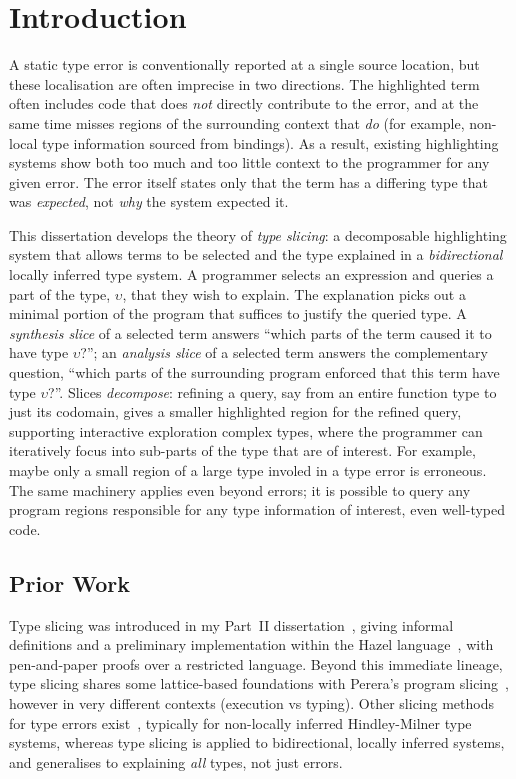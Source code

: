 \section{Introduction}
\label{sec:intro}

A static type error is conventionally reported at a single source location, but these localisation are often imprecise in two directions. The highlighted term often includes code that does \textit{not} directly contribute to the error, and at the same time misses regions of the surrounding context that \textit{do} (for example, non-local type information sourced from bindings). As a result, existing highlighting systems show both too much and too little context to the programmer for any given error. The error itself states only that the term has a differing type that was \textit{expected}, not \textit{why} the system expected it.

This dissertation develops the theory of \textit{type slicing}: a decomposable highlighting system that allows terms to be selected and the type explained in a \textit{bidirectional} locally inferred type system. A programmer selects an expression and queries a part of the type, $\upsilon$, that they wish to explain. The explanation picks out a minimal portion of the program that suffices to justify the queried type. A \textit{synthesis slice} of a selected term answers ``which parts of the term caused it to have type $\upsilon$?''; an \textit{analysis slice} of a selected term answers the complementary question, ``which parts of the surrounding program enforced that this term have type $\upsilon$?''. Slices \textit{decompose}: refining a query, say from an entire function type to just its codomain, gives a smaller highlighted region for the refined query, supporting interactive exploration complex types, where the programmer can iteratively focus into sub-parts of the type that are of interest. For example, maybe only a small region of a large type involed in a type error is erroneous. The same machinery applies even beyond errors; it is possible to query any program regions responsible for any type information of interest, even well-typed code.

\subsection{Prior Work}
\label{sec:prior-work}

Type slicing was introduced in my Part~II dissertation~\cite{Carroll2024}, giving informal definitions and a preliminary implementation within the Hazel language~\cite{HazelLivePaper}, with pen-and-paper proofs over a restricted language. Beyond this immediate lineage, type slicing shares some lattice-based foundations with Perera's program slicing~\cite{Perera2012,PereraGarg2016}, however in very different contexts (execution vs typing). Other slicing methods for type errors exist~\cite{HaackWells2003}, typically for non-locally inferred Hindley-Milner type systems, whereas type slicing is applied to bidirectional, locally inferred systems, and generalises to explaining \textit{all} types, not just errors.

